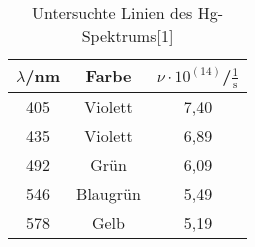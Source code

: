 \begin{table}[h]
	\begin{center}
		\begin{tabular}{ccc}
			$\lambda$/nm&Farbe&$\nu \cdot 10^{(14)}$/$\frac{1}{\text{s}}$ \\ \hline
			405&Violett&7,40\\
			435&Violett&6,89\\
			492&Grün&6,09\\
			546&Blaugrün&5,49\\
			578&Gelb&5,19
		\end{tabular}
		\caption{Untersuchte Linien des Hg-Spektrums[1]}
		\label{tabspektrum}
	\end{center}
\end{table}